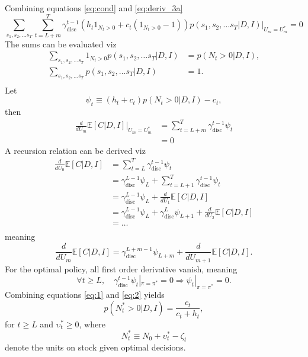 Combining equations \eqref{eq:cond} and \eqref{eq:deriv_3a}
\begin{equation}
	\sum_{s_1,s_2,\dots s_T}\sum_{t=L+m}^{T}\gamma_{\text{disc}}^{t-1}(h_t1_{N_{t}> 0}+c_t(1_{N_{t}> 0}-1))p(s_1,s_{2},\dots s_T|D,I)\Big|_{U_m=U_m^*} = 0
\end{equation}
The sums can be evaluated viz
\begin{equation}
	\begin{split}
		\sum_{s_1,s_2,\dots s_T}1_{N_{t}> 0}p(s_1,s_{2},\dots s_T|D,I) &= p(N_t> 0|D,I),\\
		\sum_{s_1,s_2,\dots s_T}p(s_1,s_{2},\dots s_T|D,I)&=1.\\
	\end{split}
\end{equation}
Let
\begin{equation}
	\psi_t\equiv (h_t+c_t)p(N_t> 0|D,I)-c_t,
	\label{eq:2}
\end{equation} 
then
\begin{equation}
	\begin{split}
		\frac{d}{dU_m}\mathbb{E}[C|D,I]\Big|_{U_m=U_m^*}& = \sum_{t=L+m}^{T}\gamma_{\text{disc}}^{t-1}\psi_t\\
		&= 0
	\end{split}
\end{equation}
A recursion relation can be derived viz
\begin{equation}
	\begin{split}
		\frac{d}{dU_0}\mathbb{E}[C|D,I]& = \sum_{t=L}^{T}\gamma_{\text{disc}}^{t-1}\psi_t\\
		& =\gamma_{\text{disc}}^{L-1}\psi_L+\sum_{t=L+1}^{T}\gamma_{\text{disc}}^{t-1}\psi_t\\
		& =\gamma_{\text{disc}}^{L-1}\psi_L+\frac{d}{dU_1}\mathbb{E}[C|D,I]\\
		& =\gamma_{\text{disc}}^{L-1}\psi_L+\gamma_{\text{disc}}^{L}\psi_{L+1}+\frac{d}{dU_2}\mathbb{E}[C|D,I]\\
		&=\dots\\
	\end{split} 
\end{equation}
meaning
\begin{equation}
		\frac{d}{dU_m}\mathbb{E}[C|D,I] =\gamma_{\text{disc}}^{L+m-1}\psi_{L+m}+\frac{d}{dU_{m+1}}\mathbb{E}[C|D,I]. 
\end{equation}
For the optimal policy, all first order derivative vanish, meaning
\begin{equation}
	\forall t\geq L, \quad \gamma_{\text{disc}}^{t-1}\psi_t|_{\pi=\pi^*}= 0 \Rightarrow \psi_t|_{\pi=\pi^*}=0.
	\label{eq:1}
\end{equation}
Combining equations \eqref{eq:1} and \eqref{eq:2} yields
\begin{equation}
	p(N_t^*> 0|D,I)=\frac{c_t}{c_t+h_t},
	\label{decision_rules}
\end{equation}
for $t\geq L$ and $\upsilon_t^*\geq 0$, where
\begin{equation}
	N_t^*\equiv N_0+\upsilon_t^*-\zeta_t
\end{equation}
denote the units on stock given optimal decisions.

